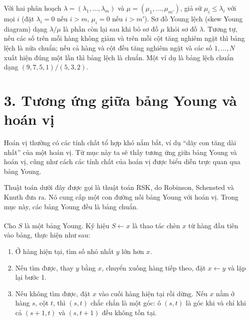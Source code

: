 \documentclass[11pt]{article}
\begin{document}
Với hai phân hoạch \(\lambda=(\lambda_1,\ldots,\lambda_m)\) và
\(\mu=(\mu_1,\ldots,\mu_{m'})\), giả sử \(\mu_i\le\lambda_i\) với mọi \(i\)
(đặt \(\lambda_i=0\) nếu \(i>m\), \(\mu_i=0\) nếu \(i>m'\)). Sơ đồ Young lệch
(skew Young diagram) dạng \(\lambda/\mu\) là phần còn lại sau khi bỏ sơ đồ
\(\mu\) khỏi sơ đồ \(\lambda\). Tương tự, nếu các số trên mỗi hàng không giảm
và trên mỗi cột tăng nghiêm ngặt thì bảng lệch là nửa chuẩn; nếu cả hàng và
cột đều tăng nghiêm ngặt và các số \(1,\ldots,N\) xuất hiện đúng một lần thì
bảng lệch là chuẩn. Một ví dụ là bảng lệch chuẩn dạng
\((9,7,5,1)/(5,3,2)\).

\section*{3. Tương ứng giữa bảng Young và hoán vị}

Hoán vị thường có các tính chất tổ hợp khó nắm bắt, ví dụ ``dãy con tăng dài
nhất'' của một hoán vị. Từ mục này ta sẽ thấy tương ứng giữa bảng Young và
hoán vị, cũng như cách các tính chất của hoán vị được biểu diễn trực quan qua
bảng Young.

Thuật toán dưới đây được gọi là thuật toán RSK, do Robinson, Schensted và
Knuth đưa ra. Nó cung cấp một con đường nối bảng Young với hoán vị. Trong mục
này, các bảng Young đều là bảng chuẩn.

\paragraph{}
Cho \(S\) là một bảng Young. Ký hiệu \(S\leftarrow x\) là thao tác chèn \(x\)
từ hàng đầu tiên vào bảng, thực hiện như sau:
\begin{enumerate}
  \item Ở hàng hiện tại, tìm số nhỏ nhất \(y\) lớn hơn \(x\).
  \item Nếu tìm được, thay \(y\) bằng \(x\), chuyển xuống hàng tiếp theo, đặt
        \(x\leftarrow y\) và lặp lại bước 1.
  \item Nếu không tìm được, đặt \(x\) vào cuối hàng hiện tại rồi dừng. Nếu
        \(x\) nằm ở hàng \(s\), cột \(t\), thì \((s,t)\) chắc chắn là một
        góc: ô \((s,t)\) là góc khi và chỉ khi cả \((s+1,t)\) và \((s,t+1)\)
        đều không tồn tại.
\end{enumerate}
\end{document}
